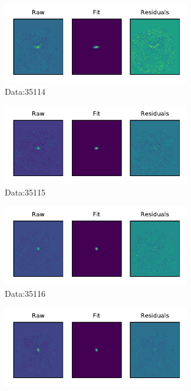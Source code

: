 \begin{figure}
    \centering
    \begin{subfigure}[b]{.45\textwidth}
        \centering
        \includegraphics[height=100pt]{CodeAndFigures/DataFits4.pdf}
        \caption{Data:35114}
        \label{fig:lmtFit4}
    \end{subfigure}
    \begin{subfigure}[b]{.45\textwidth}
        \centering
        \includegraphics[height=100pt]{CodeAndFigures/DataFits5.pdf}
        \caption{Data:35115}
        \label{fig:lmtFit5}
    \end{subfigure}
    \begin{subfigure}[b]{.45\textwidth}
        \centering
        \includegraphics[height=100pt]{CodeAndFigures/DataFits6.pdf}
        \caption{Data:35116}
        \label{fig:lmtFit6}
    \end{subfigure}
    \begin{subfigure}[b]{.45\textwidth}
        \centering
        \includegraphics[height=100pt]{CodeAndFigures/DataFits7.pdf}

\end{subfigure}
\end{figure}
